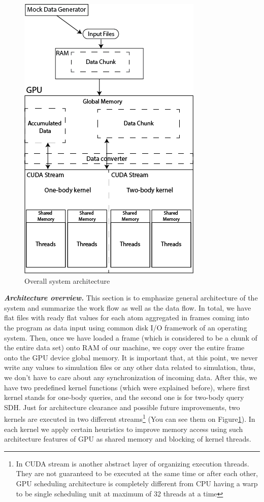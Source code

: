 \documentclass[11pt,a4paper]{report}
\begin{document}
\begin{figure}
 \centerline{ \includegraphics[width=0.65\columnwidth]{images/overallarchitecture} }
 \caption{Overall system architecture}
 \label{fg:overallarchitecture}
\end{figure}


\emph{\textbf{Architecture overview.}}
This section is to emphasize general architecture of the system and summarize the work flow as well as the data flow. In total, we have flat files with ready flat values for each atom aggregated in frames coming into the program as data input using common disk I/O framework of an operating system. Then, once we have loaded a frame (which is considered to be a chunk of the entire data set) onto RAM of our machine, we copy over the entire frame onto the GPU device global memory. It is important that, at this point, we never write any values to simulation files or any other data related to simulation, thus, we don't have to care about any synchronization of incoming data. After this, we have two predefined kernel functions (which were explained before), where first kernel stands for one-body queries, and the second one is for two-body query SDH. Just for architecture clearance and possible future improvements, two kernels are executed in two different streams\footnote{In CUDA stream is another abstract layer of organizing execution threads. They are not guaranteed to be executed at the same time or after each other, GPU scheduling architecture is completely different from CPU having a warp to be single scheduling unit at maximum of 32 threads at a time} (You can see them on Figure\ref{fg:overallarchitecture}). In each kernel we apply certain heuristics to improve memory access using such architecture features of GPU as shared memory and blocking of kernel threads.
\end{document}
